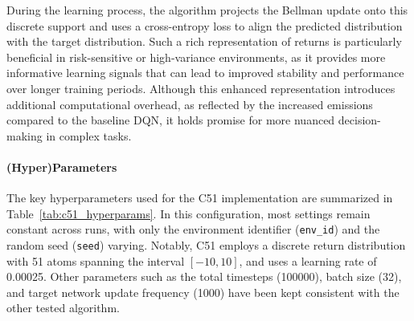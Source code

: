 During the learning process, the algorithm projects the Bellman update onto this discrete support and uses a cross-entropy loss to align the predicted distribution with the target distribution. Such a rich representation of returns is particularly beneficial in risk-sensitive or high-variance environments, as it provides more informative learning signals that can lead to improved stability and performance over longer training periods. Although this enhanced representation introduces additional computational overhead, as reflected by the increased emissions compared to the baseline DQN, it holds promise for more nuanced decision-making in complex tasks.

\paragraph{(Hyper)Parameters}
The key hyperparameters used for the C51 implementation are summarized in Table~\ref{tab:c51_hyperparams}. In this configuration, most settings remain constant across runs, with only the environment identifier (\texttt{env\_id}) and the random seed (\texttt{seed}) varying. Notably, C51 employs a discrete return distribution with 51 atoms spanning the interval $[-10, 10]$, and uses a learning rate of \num{0.00025}. Other parameters such as the total timesteps (\num{100000}), batch size (32), and target network update frequency (\num{1000}) have been kept consistent with the other tested algorithm. 

